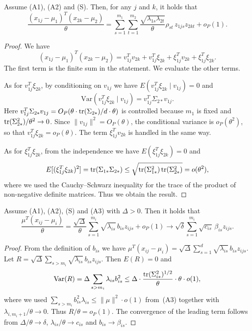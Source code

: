 \begin{lemma}
\label{lem:2}
Assume \textup{(A1)}, \textup{(A2)} and \textup{(S)}. Then, for any $j$ and $k$,
it holds that
\[
\frac{(x_{1j}-\mu_1)^T(x_{2k}-\mu_2)}{\theta}
=\sum_{s=1}^{m_1}\sum_{t=1}^{m_2}\frac{\sqrt{\lambda_{1s}\lambda_{2t}}}{\theta}\rho_{st}\,z_{1js}z_{2kt}+o_P(1).
\]
\end{lemma}

\begin{proof}
We have
\[
(x_{1j}-\mu_1)^T(x_{2k}-\mu_2)
=v_{1j}^Tv_{2k}+v_{1j}^T\xi_{2k}+\xi_{1j}^Tv_{2k}+\xi_{1j}^T\xi_{2k}.
\]
The first term is the finite sum in the statement. We evaluate the other terms.

As for $v_{1j}^T\xi_{2k}$, by conditioning on $v_{1j}$ we have
$E(v_{1j}^T\xi_{2k}\mid v_{1j})=0$ and
\[
\mathrm{Var}(v_{1j}^T\xi_{2k}\mid v_{1j})=v_{1j}^T\Sigma_{2*}v_{1j}.
\]
Here $v_{1j}^T\Sigma_{2*}v_{1j}=O_P(\theta\cdot\operatorname{tr}(\Sigma_{2*})/d\cdot\theta)$ is
controlled because $m_1$ is fixed and $\operatorname{tr}(\Sigma_{2*}^2)/\theta^2\to 0$. Since
$\|v_{1j}\|^2=O_P(\theta)$, the conditional variance is $o_P(\theta^2)$, so that
$v_{1j}^T\xi_{2k}=o_P(\theta)$. The term $\xi_{1j}^Tv_{2k}$ is handled in the same
way.

As for $\xi_{1j}^T\xi_{2k}$, from the independence we have
$E(\xi_{1j}^T\xi_{2k})=0$ and
\begin{equation}
E[(\xi_{1j}^T\xi_{2k})^2]=\operatorname{tr}(\Sigma_{1*}\Sigma_{2*})
\le\sqrt{\operatorname{tr}(\Sigma_{1*}^2)\operatorname{tr}(\Sigma_{2*}^2)}=o(\theta^2),
\label{eq:3.3}
\end{equation}
where we used the Cauchy--Schwarz inequality for the trace of the product of
non-negative definite matrices. Thus we obtain the result.
\end{proof}

\begin{lemma}
\label{lem:3}
Assume \textup{(A1)}, \textup{(A2)}, \textup{(S)} and \textup{(A3)} with
$\Delta>0$. Then it holds that
\[
\frac{\mu^T(x_{ij}-\mu_i)}{\theta}
=\frac{\sqrt{\Delta}}{\theta}\sum_{s=1}^{m_i}\sqrt{\lambda_{is}}\,b_{is}z_{ijs}+o_P(1)
\longrightarrow
\sqrt{\delta}\sum_{s=1}^{m_i}\sqrt{c_{is}}\,\beta_{is}z_{ijs}.
\]
\end{lemma}

\begin{proof}
From the definition of $b_{is}$ we have
$\mu^T(x_{ij}-\mu_i)=\sqrt{\Delta}\sum_{s=1}^d\sqrt{\lambda_{is}}\,b_{is}z_{ijs}$.
Let $R=\sqrt{\Delta}\sum_{s>m_i}\sqrt{\lambda_{is}}\,b_{is}z_{ijs}$. Then
$E(R)=0$ and
\[
\mathrm{Var}(R)=\Delta\sum_{s>m_i}\lambda_{is}b_{is}^2
\le\Delta\cdot\frac{\operatorname{tr}(\Sigma_{i*}^2)^{1/2}}{\theta}\cdot\theta
\cdot o(1),
\]
where we used $\sum_{s>m_i}b_{is}^2\lambda_{is}\le\|\mu\|^2\cdot o(1)$ from~(A3)
together with $\lambda_{i,m_i+1}/\theta\to 0$. Thus $R/\theta=o_P(1)$. The
convergence of the leading term follows from $\Delta/\theta\to\delta$,
$\lambda_{is}/\theta\to c_{is}$ and $b_{is}\to\beta_{is}$.
\end{proof}

